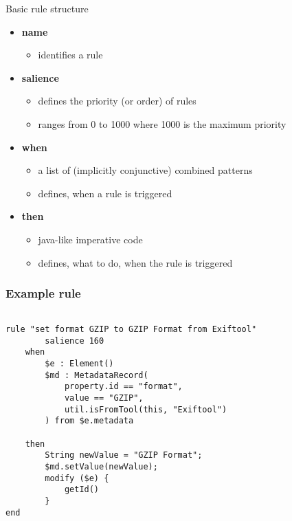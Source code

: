 \documentclass{beamer}
\begin{document}
\begin{frame}{Basic rule structure}

   \begin{itemize}
   \item \textbf{name}
   \begin{itemize}
	   \item identifies a rule
   \end{itemize}
   \item \textbf{salience}
   \begin{itemize}
   		\item defines the priority (or order) of rules
   		\item ranges from 0 to 1000 where 1000 is the maximum priority
   \end{itemize}
   \item \textbf{when} 
   \begin{itemize}
   		\item a list of (implicitly conjunctive) combined patterns
   		\item defines, when a rule is triggered
   \end{itemize}
   \item \textbf{then}
   \begin{itemize}
   		\item java-like imperative code 
   		\item defines, what to do, when the rule is triggered
   \end{itemize} 
   \end{itemize}
  
\note{

}
\end{frame}

\begin{frame}[fragile]
\frametitle{Example rule}

\begin{lstlisting}

rule "set format GZIP to GZIP Format from Exiftool"
        salience 160
    when 
        $e : Element()
        $md : MetadataRecord(
            property.id == "format", 
            value == "GZIP",
            util.isFromTool(this, "Exiftool")
        ) from $e.metadata

    then
        String newValue = "GZIP Format";
        $md.setValue(newValue);
        modify ($e) {
            getId()
        }
end
\end{lstlisting}

\end{frame}
\end{document}
